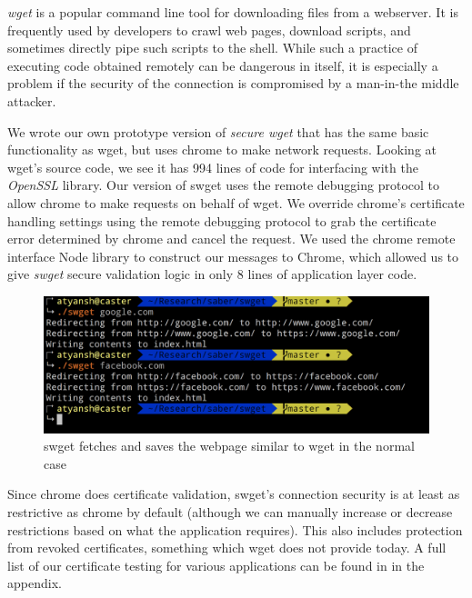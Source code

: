 \emph{wget} is a popular command line tool for downloading files from a
webserver. It is frequently used by developers to crawl web pages, download
scripts, and sometimes directly pipe such scripts to the shell. While such a
practice of executing code obtained remotely can be dangerous in itself, it
is especially a problem if the security of the connection is compromised by a
man-in-the middle attacker.

We wrote our own prototype version of \emph{secure wget} that has the same
basic functionality as wget, but uses chrome to make network requests. Looking
at wget's source code, we see it has 994 lines of code for interfacing with the
\emph{OpenSSL} library. Our version of swget uses the remote debugging protocol
to allow chrome to make requests on behalf of wget. We override chrome's
certificate handling settings using the remote debugging protocol to grab the
certificate error determined by chrome and cancel the request. We used the
chrome remote interface Node library to construct our messages to Chrome, which
allowed us to give \emph{swget} secure validation logic in only 8 lines of
application layer code.


\begin{figure}[h]
  \includegraphics[width=\textwidth]{figures/regular}
  \caption[Regular usage of swget]{swget fetches and saves the webpage similar
  to wget in the normal case}
  \label{fig:regular-saber}
\end{figure}

Since chrome does certificate validation, swget's connection security is at
least as restrictive as chrome by default (although we can manually increase or
decrease restrictions based on what the application requires). This also
includes protection from revoked certificates, something which wget does not
provide today. A full list of our certificate testing for various applications
can be found in  in the appendix.

